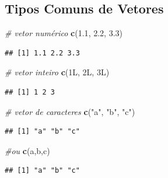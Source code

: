 \documentclass[
]{book}
\newenvironment{Shaded}{\begin{snugshade}}{\end{snugshade}}
\newcommand{\CommentTok}[1]{\textcolor[rgb]{0.56,0.35,0.01}{\textit{#1}}}
\newcommand{\DataTypeTok}[1]{\textcolor[rgb]{0.13,0.29,0.53}{#1}}
\newcommand{\DecValTok}[1]{\textcolor[rgb]{0.00,0.00,0.81}{#1}}
\newcommand{\FloatTok}[1]{\textcolor[rgb]{0.00,0.00,0.81}{#1}}
\newcommand{\FunctionTok}[1]{\textcolor[rgb]{0.13,0.29,0.53}{\textbf{#1}}}
\newcommand{\NormalTok}[1]{#1}
\newcommand{\StringTok}[1]{\textcolor[rgb]{0.31,0.60,0.02}{#1}}
\begin{document}
\subsection{Tipos Comuns de Vetores}\label{tipos-comuns-de-vetores}

\begin{Shaded}
\begin{Highlighting}[]
\CommentTok{\# vetor numérico}
\FunctionTok{c}\NormalTok{(}\FloatTok{1.1}\NormalTok{, }\FloatTok{2.2}\NormalTok{, }\FloatTok{3.3}\NormalTok{)}
\end{Highlighting}
\end{Shaded}

\begin{verbatim}
## [1] 1.1 2.2 3.3
\end{verbatim}

\begin{Shaded}
\begin{Highlighting}[]
\CommentTok{\# vetor inteiro}
\FunctionTok{c}\NormalTok{(}\DecValTok{1}\DataTypeTok{L}\NormalTok{, }\DecValTok{2}\DataTypeTok{L}\NormalTok{, }\DecValTok{3}\DataTypeTok{L}\NormalTok{) }
\end{Highlighting}
\end{Shaded}

\begin{verbatim}
## [1] 1 2 3
\end{verbatim}

\begin{Shaded}
\begin{Highlighting}[]
\CommentTok{\# vetor de caracteres}
\FunctionTok{c}\NormalTok{(}\StringTok{"a"}\NormalTok{, }\StringTok{"b"}\NormalTok{, }\StringTok{"c"}\NormalTok{) }
\end{Highlighting}
\end{Shaded}

\begin{verbatim}
## [1] "a" "b" "c"
\end{verbatim}

\begin{Shaded}
\begin{Highlighting}[]
\CommentTok{\#ou}
\FunctionTok{c}\NormalTok{(}\StringTok{\textquotesingle{}a\textquotesingle{}}\NormalTok{,}\StringTok{\textquotesingle{}b\textquotesingle{}}\NormalTok{,}\StringTok{\textquotesingle{}c\textquotesingle{}}\NormalTok{)}
\end{Highlighting}
\end{Shaded}

\begin{verbatim}
## [1] "a" "b" "c"
\end{verbatim}
\end{document}

